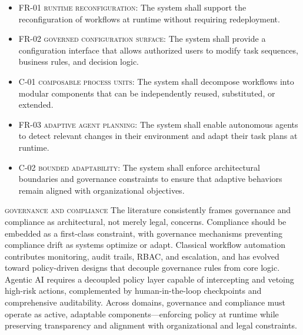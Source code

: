 \begin{itemize}
  \item \textsc{FR-01 runtime reconfiguration}: The system shall support the reconfiguration of workflows at runtime without requiring redeployment.
  \item \textsc{FR-02 governed configuration surface}: The system shall provide a configuration interface that allows authorized users to modify task sequences, business rules, and decision logic.
  \item \textsc{C-01 composable process units}: The system shall decompose workflows into modular components that can be independently reused, substituted, or extended.
  \item \textsc{FR-03 adaptive agent planning}: The system shall enable autonomous agents to detect relevant changes in their environment and adapt their task plans at runtime.
  \item \textsc{C-02 bounded adaptability}: The system shall enforce architectural boundaries and governance constraints to ensure that adaptive behaviors remain aligned with organizational objectives.
\end{itemize}

\noindent \textsc{governance and compliance} \quad The literature consistently frames governance and compliance as architectural, not merely legal, concerns. Compliance should be embedded as a first-class constraint, with governance mechanisms preventing compliance drift as systems optimize or adapt. Classical workflow automation contributes monitoring, audit trails, RBAC, and escalation, and has evolved toward policy-driven designs that decouple governance rules from core logic. Agentic AI requires a decoupled policy layer capable of intercepting and vetoing high-risk actions, complemented by human-in-the-loop checkpoints and comprehensive auditability. Across domains, governance and compliance must operate as active, adaptable components—enforcing policy at runtime while preserving transparency and alignment with organizational and legal constraints.

